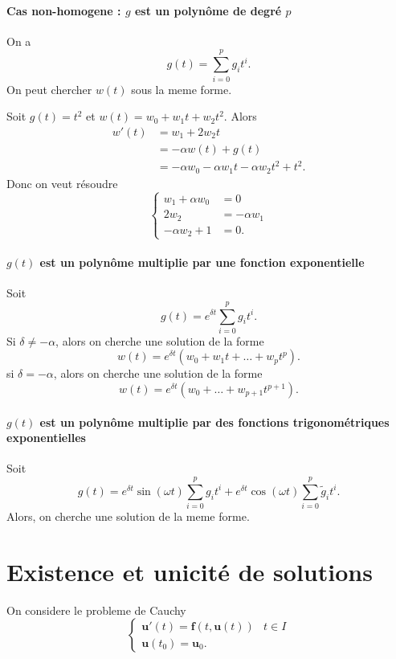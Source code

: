 \paragraph{Cas non-homogene : $g$ est un polynôme de degré $p$}
On a 
$$
g(t)=\sum_{i=0}^{p} g_{i}t^{i}.
$$
On peut chercher $w(t)$ sous la meme forme. 
\begin{example}
Soit $g(t)=t^{2}$ et $w(t)=w_{0}+w_{1}t+w_{2}t^{2}$. Alors
\begin{align*}
w'(t) & =w_{1}+2w_{2}t \\
 & =-\alpha w(t)+g(t) \\
 & =-\alpha w_{0}-\alpha w_{1}t-\alpha w_{2}t^{2}+t^{2}.
\end{align*}
Donc on veut résoudre
$$
\begin{cases}
w_{1}+\alpha w_{0}  & =0 \\
2w_{2} & =-\alpha w_{1} \\
-\alpha w_{2}+1 & =0.
\end{cases}
$$
\end{example}
\paragraph{$g(t)$ est un polynôme multiplie par une fonction exponentielle}
Soit
$$
g(t)=e^{\delta t}\sum_{i=0}^{p} g_{i}t^{i}.
$$
Si $\delta\neq -\alpha$, alors on cherche une solution de la forme
$$
w(t)=e^{ \delta t }(w_{0}+w_{1}t+\dots +w_{p}t^{p}).
$$
si $\delta=-\alpha$, alors on cherche une solution de la forme
$$
w(t)=e^{ \delta t }(w_{0}+\dots +w_{p+1}t^{p+1}).
$$
\paragraph{$g(t)$ est un polynôme multiplie par des fonctions trigonométriques exponentielles}
Soit
$$
g(t)=e^{ \delta t }\sin(\omega t)\sum_{i=0}^{p} g_{i}t^{i}+e^{ \delta t }\cos(\omega t)\sum_{i=0}^{p} \tilde{g}_{i}t^{i}.
$$
Alors, on cherche une solution de la meme forme. 
\section{Existence et unicité de solutions}
On considere le probleme de Cauchy
\begin{equation}\label{pb251}
\begin{cases}
\boldsymbol{u}'(t)=\boldsymbol{f}(t,\boldsymbol{u}(t)) & t\in I \\
\boldsymbol{u}(t_{0})=\boldsymbol{u}_{0}.
\end{cases}
\end{equation}

